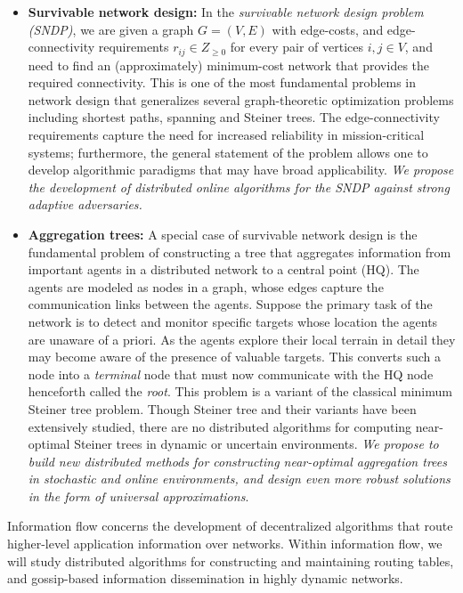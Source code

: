 \begin{itemize}
\item
{\bf Survivable network design:} In the {\em survivable network design
  problem (SNDP)}, we are given a graph $G = (V,E)$ with edge-costs, and
edge-connectivity requirements $r_{ij} \in Z_{\ge 0}$ for every pair
of vertices $i, j \in V$, and need to find an (approximately)
minimum-cost network that provides the required connectivity.  This is
one of the most fundamental problems in network design that
generalizes several graph-theoretic optimization problems including
shortest paths, spanning and Steiner trees.  The edge-connectivity
requirements capture the need for increased reliability in
mission-critical systems; furthermore, the general statement of the
problem allows one to develop algorithmic paradigms that may have
broad applicability. {\em We propose the development of distributed online algorithms for the SNDP against strong adaptive adversaries.}

\item
{\bf Aggregation trees:} A special case of survivable network design
is the fundamental problem of constructing a tree that aggregates
information from important agents in a distributed network to a
central point (HQ). The agents are modeled as nodes in a graph, whose
edges capture the communication links between the agents.  Suppose the
primary task of the network is to detect and monitor specific targets
whose location the agents are unaware of a priori.  As the agents
explore their local terrain in detail they may become aware of the
presence of valuable targets. This converts such a node into a {\em
  terminal} node that must now communicate with the HQ node henceforth
called the {\em root}.  This problem is a variant of the classical
minimum Steiner tree problem.  Though Steiner tree and their variants
have been extensively studied, there are no distributed algorithms for
computing near-optimal Steiner trees in dynamic or uncertain
environments.  {\em We propose to build new distributed methods for constructing
near-optimal aggregation trees in stochastic and online environments, and design even more robust solutions in the form of universal approximations}.
\end{itemize}

Information flow concerns the development of decentralized algorithms
that route higher-level application information over networks.  Within
information flow, we will study distributed algorithms for
constructing and maintaining routing tables, and gossip-based
information dissemination in highly dynamic networks.

